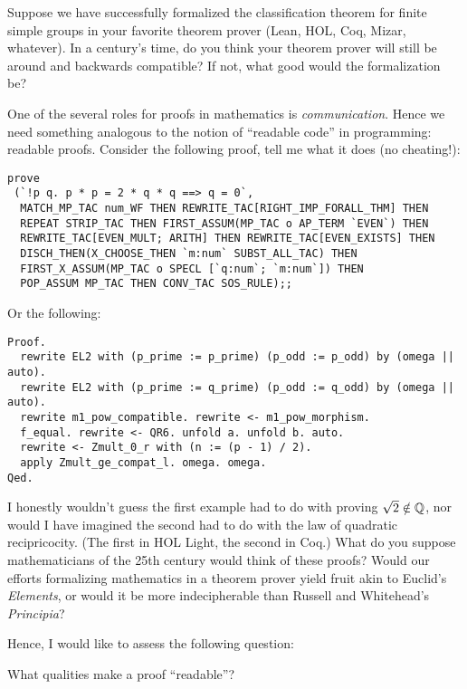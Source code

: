 \M
Suppose we have successfully formalized the classification theorem for
finite simple groups in your favorite theorem prover (Lean, HOL, Coq,
Mizar, whatever). In a century's time, do you think your theorem prover
will still be around and backwards compatible? If not, what good would
the formalization be?

One of the several roles for proofs in mathematics is
\emph{communication}. Hence we need something analogous to the notion of
``readable code'' in programming: readable proofs. Consider the
following proof, tell me what it does (no cheating!):

\begin{Verbatim}
prove
 (`!p q. p * p = 2 * q * q ==> q = 0`,
  MATCH_MP_TAC num_WF THEN REWRITE_TAC[RIGHT_IMP_FORALL_THM] THEN
  REPEAT STRIP_TAC THEN FIRST_ASSUM(MP_TAC o AP_TERM `EVEN`) THEN
  REWRITE_TAC[EVEN_MULT; ARITH] THEN REWRITE_TAC[EVEN_EXISTS] THEN
  DISCH_THEN(X_CHOOSE_THEN `m:num` SUBST_ALL_TAC) THEN
  FIRST_X_ASSUM(MP_TAC o SPECL [`q:num`; `m:num`]) THEN
  POP_ASSUM MP_TAC THEN CONV_TAC SOS_RULE);;
\end{Verbatim}

Or the following:

\begin{Verbatim}
Proof.
  rewrite EL2 with (p_prime := p_prime) (p_odd := p_odd) by (omega || auto).
  rewrite EL2 with (p_prime := q_prime) (p_odd := q_odd) by (omega || auto).
  rewrite m1_pow_compatible. rewrite <- m1_pow_morphism.
  f_equal. rewrite <- QR6. unfold a. unfold b. auto.
  rewrite <- Zmult_0_r with (n := (p - 1) / 2).
  apply Zmult_ge_compat_l. omega. omega.
Qed.
\end{Verbatim}

I honestly wouldn't guess the first example had to do with proving
$\sqrt{2}\notin\mathbb{Q}$, nor would I have imagined the second had to do with
the law of quadratic recipricocity. (The first in HOL Light, the second
in Coq.) What do you suppose mathematicians of the 25th century would
think of these proofs? Would our efforts formalizing mathematics in a
theorem prover yield fruit akin to Euclid's \emph{Elements}, or would it
be more indecipherable than Russell and Whitehead's \emph{Principia}?

Hence, I would like to assess the following question:

\begin{puzzle}
What qualities make a proof ``readable''?
\end{puzzle}

